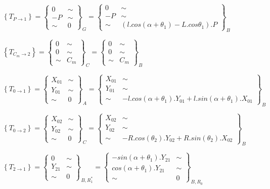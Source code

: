 $\left\{T_{P\rightarrow 1}\right\}=\left\{\begin{array}{cc}
0 & \sim \\
-P & \sim \\
\sim & 0
\end{array}\right\}_G=
\left\{\begin{array}{cc}
0 & \sim \\
-P & \sim \\
\sim & (l.cos(\alpha+\theta_1)-L.cos\theta_1).P
\end{array}\right\}_B$

$\left\{T_{C_m\rightarrow 2}\right\}=\left\{\begin{array}{cc}
0 & \sim \\
0 & \sim \\
\sim & C_m
\end{array}\right\}_C=
\left\{\begin{array}{cc}
0 & \sim \\
0 & \sim \\
\sim & C_m
\end{array}\right\}_B$

$\left\{T_{0\rightarrow 1}\right\}=\left\{\begin{array}{cc}
X_{01} & \sim \\
Y_{01} & \sim \\
\sim & 0
\end{array}\right\}_A=
\left\{\begin{array}{cc}
X_{01} & \sim \\
Y_{01} & \sim \\
\sim & -l.cos(\alpha+\theta_1).Y_{01}+l.sin(\alpha+\theta_1).X_{01}
\end{array}\right\}_B$

$\left\{T_{0\rightarrow 2}\right\}=\left\{\begin{array}{cc}
X_{02} & \sim \\
Y_{02} & \sim \\
\sim & 0
\end{array}\right\}_C=
\left\{\begin{array}{cc}
X_{02} & \sim \\
Y_{02} & \sim \\
\sim & -R.cos(\theta_2).Y_{02}+R.sin(\theta_2).X_{02}
\end{array}\right\}_B$

$\left\{T_{2\rightarrow 1}\right\}=\left\{\begin{array}{cc}
0 & \sim \\
Y_{21} & \sim \\
\sim & 0
\end{array}\right\}_{B,R_1^*}=
\left\{\begin{array}{cc}
-sin(\alpha+\theta_1).Y_{21} & \sim \\
cos(\alpha+\theta_1).Y_{21} & \sim \\
\sim & 0
\end{array}\right\}_{B,R_0}$

